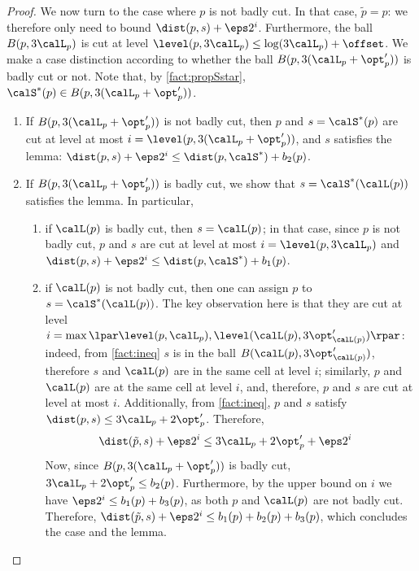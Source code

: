 \begin{proof}
 We now turn to the case where $p$ is not badly cut. In that case, $\tilde p = p$: we therefore only need to bound $\dist( p, s) + \eps 2^i$. 
 Furthermore, the ball $B(p, 3\calL_p)$ is cut at level $\level(p, 3\calL_p) \leq \log(3\calL_p)+\offset$. 
We make a case distinction according to whether the ball $B(p, 3(\calL_p + \opt'_p))$  is badly cut or not. Note that, by \cref{fact:propSstar}, $ \calS^*(p) \in B(p, 3(\calL_p + \opt'_p))$.
 \begin{enumerate}
  \item If $B(p, 3(\calL_p + \opt'_p))$ is not badly cut, then $p$ and $s = \calS^*(p)$ are cut at level at most $i = \level(p, 3(\calL_p + \opt'_p))$, and $s$ satisfies the lemma: $\dist(p, s) + \eps 2^i \leq \dist(p, \calS^*) + b_2(p)$.
  \item If $B(p, 3(\calL_p + \opt'_p))$ is badly cut, we show that $s= \calS^*(\calL(p))$ satisfies the lemma. In particular,
  \begin{enumerate}
      \item if $\calL(p)$ is badly cut, then $s = \calL(p)$; in that case, since $p$ is not badly cut, $p$ and $s$ are cut at level at most $i = \level(p, 3\calL_p)$ and $\dist(p, s) + \eps 2^i \leq \dist(p, \calS^*) + b_1(p)$.
      \item if $\calL(p)$ is not badly cut, then one can assign $p$ to $s=\calS^*(\calL(p))$. The key observation here is that they are cut at level $i = \max\lpar \level(p, \calL_p), \level(\calL(p),  3\opt'_{\calL(p)}) \rpar$: indeed, from \cref{fact:ineq} $s$ is in the ball $B(\calL(p), 3\opt'_{\calL(p)})$, therefore $s$ and $\calL(p)$ are in the same cell at level $i$; similarly, $p$ and $\calL(p)$ are at the same cell at level $i$, and, therefore, $p$ and $s$ are cut at level at most $i$.  Additionally, from \cref{fact:ineq}, $p$ and $s$ satisfy $\dist(p, s) \leq 3\calL_p + 2\opt'_p$.    
 Therefore,
       \begin{align*}
           \dist(\tilde p, s) + \eps 2^i &\leq 
           3\calL_p + 2\opt'_p + \eps 2^i
       \end{align*}
    Now, since $B(p, 3(\calL_p + \opt'_p))$ is badly cut, $3\calL_p + 2\opt'_p \leq b_2(p)$. Furthermore, by the upper bound on $i$ we have $\eps 2^{i} \leq b_1(p) + b_3(p)$, as both $p$ and $\calL(p)$ are not badly cut. 
    Therefore, $\dist(\tilde p, s) + \eps 2^i \leq b_1(p)+ b_2(p) + b_3(p)$, which concludes the case and the lemma.
  \end{enumerate}
\end{enumerate}
%
\end{proof}


